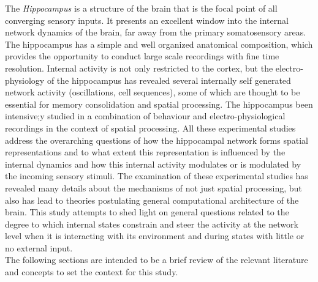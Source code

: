 The \emph{Hippocampus} is a structure of the brain that is the focal point of all converging sensory inputs. It presents an excellent window into the internal network dynamics of the brain, far away from the primary somatosensory areas. The hippocampus has a simple and well organized anatomical composition, which provides the opportunity to conduct large scale recordings with fine time resolution. Internal activity is not only restricted to the cortex, but the electro-physiology of the hippocampus has revealed several internally self generated network activity (oscillations, cell sequences), some of which are thought to be essential for memory consolidation and spatial processing.  
The hippocampus been intensive;y studied in a combination of behaviour and electro-physiological recordings in the context of spatial processing. All these experimental studies address the overarching questions of how the hippocampal network forms spatial representations and to what extent this representation is influenced by the internal dynamics and how this internal activity modulates or is modulated by the incoming sensory stimuli. The examination of these experimental studies has revealed many details about the mechanisms of not just spatial processing, but also has lead to theories postulating general computational architecture of the brain. This study attempts to shed light on general questions related to the degree to which internal states constrain and steer the activity at the network level when it is interacting with its environment and during states with little or no external input. \\
The following sections are intended to be a brief review of the relevant literature and concepts to set the context for this study.





%
%
%
%


